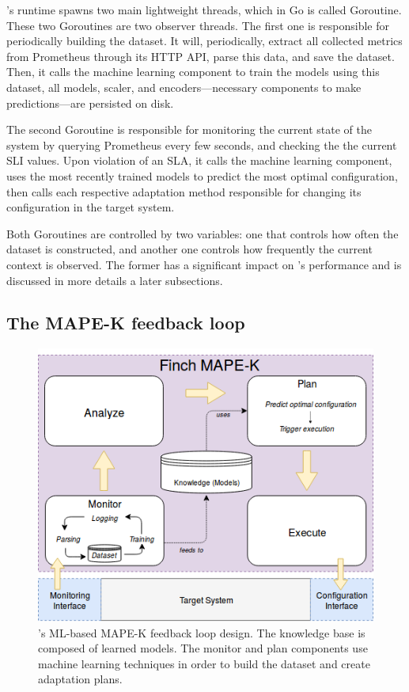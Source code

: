 \projectname{}'s runtime spawns two main lightweight threads, which in Go is called Goroutine. These two Goroutines are two observer threads. The first one is responsible for periodically building the dataset. It will, periodically, extract all collected metrics from Prometheus through its HTTP API, parse this data, and save the dataset. Then, it calls the machine learning component to train the models using this dataset, all models, scaler, and encoders---necessary components to make predictions---are persisted on disk.

The second Goroutine is responsible for monitoring the current state of the system by querying Prometheus every few seconds, and checking the the current SLI values. Upon violation of an SLA, it calls the machine learning component, uses the most recently trained models to predict the most optimal configuration, then calls each respective adaptation method responsible for changing its configuration in the target system.

Both Goroutines are controlled by two variables: one that controls how often the dataset is constructed, and another one controls how frequently the current context is observed. The former has a significant impact on \projectname{}'s performance and is discussed in more details a later subsections.

\subsection{The MAPE-K feedback loop}

\begin{figure}[h]
  \includegraphics[scale=0.5]{images/FinchMAPE.png}
  \caption{\projectname{}'s ML-based MAPE-K feedback loop design. The knowledge base is composed of learned models. The monitor and plan components use machine learning techniques in order to build the dataset and create adaptation plans.}
  \label{fig:finchMape}
\end{figure}

